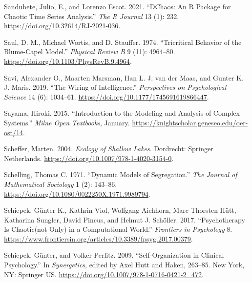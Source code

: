 \documentclass[
  a4paper,
  DIV=11,
  numbers=noendperiod,
  oneside]{scrreprt}
\newlength{\cslhangindent}
\newlength{\cslentryspacingunit} %
\newenvironment{CSLReferences}[2] %
 {%
  \setlength{\parindent}{0pt}
  \ifodd #1
  \let\oldpar\par
  \def\par{\hangindent=\cslhangindent\oldpar}
  \fi
  \setlength{\parskip}{#2\cslentryspacingunit}
 }%
 {}
\begin{document}
\begin{CSLReferences}{1}{0}
\leavevmode{}%
Sandubete, Julio, E., and Lorenzo Escot. 2021. {``{DChaos}: {An R
Package} for {Chaotic Time Series Analysis}.''} \emph{The R Journal} 13
(1): 232. \url{https://doi.org/10.32614/RJ-2021-036}.

\leavevmode{}%
Saul, D. M., Michael Wortis, and D. Stauffer. 1974. {``Tricritical
Behavior of the {Blume-Capel} Model.''} \emph{Physical Review B} 9 (11):
4964--80. \url{https://doi.org/10.1103/PhysRevB.9.4964}.

\leavevmode{}%
Savi, Alexander O., Maarten Marsman, Han L. J. van der Maas, and Gunter
K. J. Maris. 2019. {``The {Wiring} of {Intelligence}.''}
\emph{Perspectives on Psychological Science} 14 (6): 1034--61.
\url{https://doi.org/10.1177/1745691619866447}.

\leavevmode{}%
Sayama, Hiroki. 2015. {``Introduction to the Modeling and Analysis of
Complex Systems.''} \emph{Milne Open Textbooks}, January.
\url{https://knightscholar.geneseo.edu/oer-ost/14}.

\leavevmode{}%
Scheffer, Marten. 2004. \emph{Ecology of {Shallow Lakes}}. {Dordrecht}:
{Springer Netherlands}. \url{https://doi.org/10.1007/978-1-4020-3154-0}.

\leavevmode{}%
Schelling, Thomas C. 1971. {``Dynamic Models of Segregation.''}
\emph{The Journal of Mathematical Sociology} 1 (2): 143--86.
\url{https://doi.org/10.1080/0022250X.1971.9989794}.

\leavevmode{}%
Schiepek, Günter K., Kathrin Viol, Wolfgang Aichhorn, Marc-Thorsten
Hütt, Katharina Sungler, David Pincus, and Helmut J. Schöller. 2017.
{``Psychotherapy Is Chaotic{\textemdash}(not Only) in a Computational
World.''} \emph{Frontiers in Psychology} 8.
\url{https://www.frontiersin.org/articles/10.3389/fpsyg.2017.00379}.

\leavevmode{}%
Schiepek, Günter, and Volker Perlitz. 2009. {``Self-{Organization} in
{Clinical Psychology}.''} In \emph{Synergetics}, edited by Axel Hutt and
Haken, 263--85. {New York, NY}: {Springer US}.
\url{https://doi.org/10.1007/978-1-0716-0421-2_472}.


\end{CSLReferences}
\end{document}
